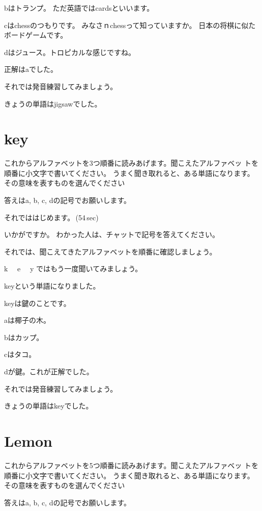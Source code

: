 \documentclass[12pt]{jlreq}
\begin{document}
bはトランプ。
ただ英語ではcardsといいます。

cはchessのつもりです。
みなさｎchessって知っていますか。
日本の将棋に似たボードゲームです。

dはジュース。トロピカルな感じですね。



正解はaでした。

それでは発音練習してみましょう。

きょうの単語はjigsawでした。
\newpage
\section{key}

これからアルファベットを3つ順番に読みあげます。聞こえたアルファベッ
トを順番に小文字で書いてください。
うまく聞き取れると、ある単語になります。
その意味を表すものを選んでください

答えはa, b, c, dの記号でお願いします。

それでははじめます。\faVolumeUp\,(54\,sec)

いかがですか。
わかった人は、チャットで記号を答えてください。

それでは、聞こえてきたアルファベットを順番に確認しましょう。{\large \ComputerMouse}

k\,\,
{\large \ComputerMouse}\,\,
e\,\,
{\large \ComputerMouse}\,\,
y
ではもう一度聞いてみましょう。

keyという単語になりました。

keyは鍵のことです。

aは椰子の木。

bはカップ。

cはタコ。

dが鍵。これが正解でした。


それでは発音練習してみましょう。

きょうの単語はkeyでした。
\newpage
\section{Lemon}

これからアルファベットを5つ順番に読みあげます。聞こえたアルファベッ
トを順番に小文字で書いてください。
うまく聞き取れると、ある単語になります。
その意味を表すものを選んでください

答えはa, b, c, dの記号でお願いします。
\end{document}
